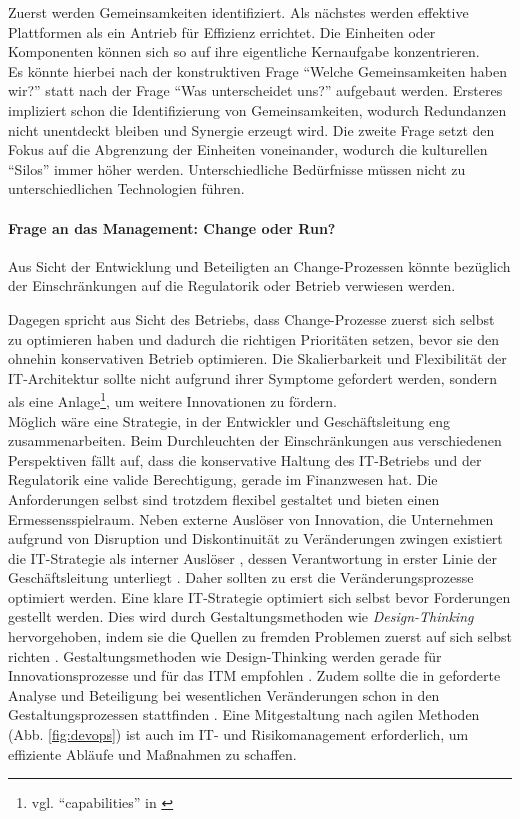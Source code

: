 Zuerst werden Gemeinsamkeiten identifiziert. Als nächstes werden effektive Plattformen als ein Antrieb für Effizienz errichtet. Die Einheiten oder Komponenten können sich so auf ihre eigentliche Kernaufgabe konzentrieren. 
\medskip
\\
Es könnte hierbei nach der konstruktiven Frage \enquote{Welche Gemeinsamkeiten haben wir?} statt nach der Frage \enquote{Was unterscheidet uns?} aufgebaut werden. Ersteres impliziert schon die Identifizierung von Gemeinsamkeiten, wodurch Redundanzen nicht unentdeckt bleiben und Synergie erzeugt wird. Die zweite Frage setzt den Fokus auf die Abgrenzung der Einheiten voneinander, wodurch die kulturellen \enquote{Silos} immer höher werden. Unterschiedliche Bedürfnisse müssen nicht zu unterschiedlichen Technologien führen. 

\paragraph{Frage an das Management: Change oder Run?}
Aus Sicht der Entwicklung und Beteiligten an Change-Prozessen könnte bezüglich der Einschränkungen auf die Regulatorik oder Betrieb verwiesen werden.

Dagegen spricht aus Sicht des Betriebs, dass Change-Prozesse zuerst sich selbst zu optimieren haben und dadurch die richtigen Prioritäten setzen, bevor sie den ohnehin konservativen Betrieb optimieren. Die Skalierbarkeit und Flexibilität der IT-Architektur sollte nicht aufgrund ihrer Symptome gefordert werden, sondern als eine Anlage\footnote{vgl. \enquote{capabilities} in \cite{Koch2016}}, um weitere Innovationen zu fördern.
\medskip
\\
Möglich wäre eine Strategie, in der Entwickler und Geschäftsleitung eng zusammenarbeiten.
Beim Durchleuchten der Einschränkungen aus verschiedenen Perspektiven fällt auf, dass die konservative Haltung des IT-Betriebs und der Regulatorik eine valide Berechtigung, gerade im Finanzwesen hat. Die Anforderungen selbst sind trotzdem flexibel gestaltet und bieten einen Ermessensspielraum. 
Neben externe Auslöser von Innovation, die Unternehmen aufgrund von Disruption und Diskontinuität zu Veränderungen zwingen \cite{Gupta:2017, Fernandez:2020} existiert die IT-Strategie als interner Auslöser \cite{BAIT:2018, Alt2017}, dessen Verantwortung in erster Linie der Geschäftsleitung unterliegt \cite{BAIT:2018}. Daher sollten zu erst die Veränderungsprozesse optimiert werden. Eine klare IT-Strategie optimiert sich selbst bevor Forderungen gestellt werden. Dies wird durch Gestaltungsmethoden wie \emph{Design-Thinking} hervorgehoben, indem sie die Quellen zu fremden Problemen zuerst auf sich selbst richten \cite{yüksel:digit}. Gestaltungsmethoden wie Design-Thinking werden gerade für Innovationsprozesse und für das \ac{ITM} empfohlen \cite{Alt2017, Koch2016}. Zudem sollte die in \citet[AT 8.2]{MaRisk:2017} geforderte Analyse und Beteiligung bei wesentlichen Veränderungen schon in den Gestaltungsprozessen stattfinden \cite{Dorschel2018}. Eine Mitgestaltung nach agilen Methoden (Abb. \ref{fig:devops}) ist auch im IT- und Risikomanagement erforderlich, um effiziente Abläufe und Maßnahmen zu schaffen.

